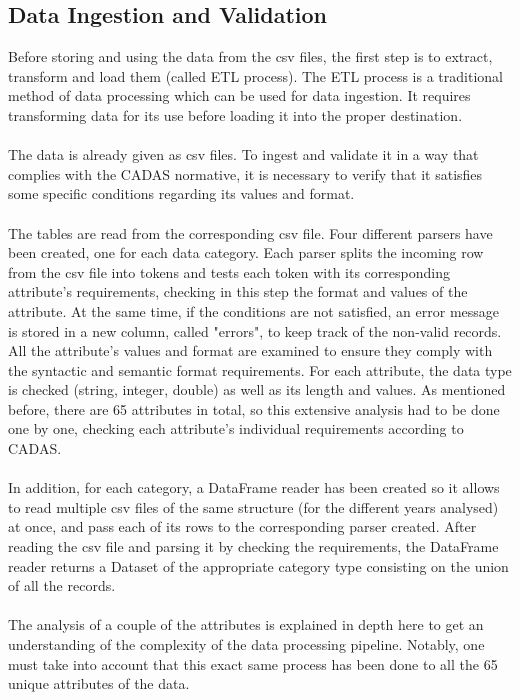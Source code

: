 \subsection{Data Ingestion and Validation}
\label{sec:validation}
Before storing and using the data from the csv files, the first step is to extract, transform and load them (called \ac{ETL} process). The \ac{ETL} process is a traditional method of data processing which can be used for data ingestion. It requires transforming data for its use before loading it into the proper destination.
\\
\\
The data is already given as csv files. To ingest and validate it in a way that complies with the \ac{CADAS} normative, it is necessary to verify that it satisfies some specific conditions regarding its values and format. 
\\
\\
The tables are read from the corresponding csv file. Four different parsers have been created, one for each data category. Each parser splits the incoming row from the csv file into tokens and tests each token with its corresponding attribute's requirements, checking in this step the format and values of the attribute. At the same time, if the conditions are not satisfied, an error message is stored in a new column, called "errors", to keep track of the non-valid records. 
All the attribute's values and format are examined to ensure they comply with the syntactic and semantic format requirements. For each attribute, the data type is checked (string, integer, double) as well as its length and values. As mentioned before, there are 65 attributes in total, so this extensive analysis had to be done one by one, checking each attribute's individual requirements according to \ac{CADAS}.
\\
\\
In addition, for each category, a DataFrame reader has been created so it allows to read multiple csv files of the same structure (for the different years analysed) at once, and pass each of its rows to the corresponding parser created. After reading the csv file and parsing it by checking the requirements, the DataFrame reader returns a Dataset of the appropriate category type consisting on the union of all the records.
\\
\\
The analysis of a couple of the attributes is explained in depth here to get an understanding of the complexity of the data processing pipeline. Notably, one must take into account that this exact same process has been done to all the 65 unique attributes of the data. 

